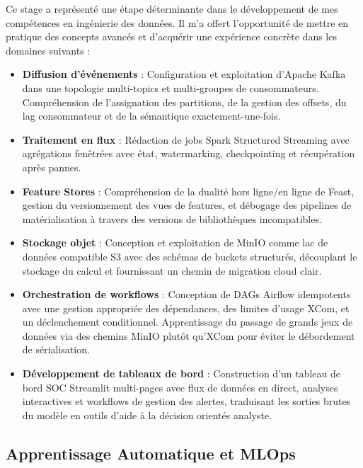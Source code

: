 \documentclass[12pt,a4paper,oneside]{book}
\theoremstyle{definition}
\theoremstyle{plain}
\begin{document}
Ce stage a représenté une étape déterminante dans le développement de mes compétences en ingénierie des données. Il m'a offert l'opportunité de mettre en pratique des concepts avancés et d'acquérir une expérience concrète dans les domaines suivants :
\begin{itemize}
  \item \textbf{Diffusion d'événements} : Configuration et exploitation d'Apache Kafka dans une topologie multi-topics et multi-groupes de consommateurs. Compréhension de l'assignation des partitions, de la gestion des offsets, du lag consommateur et de la sémantique exactement-une-fois.
  \item \textbf{Traitement en flux} : Rédaction de jobs Spark Structured Streaming avec agrégations fenêtrées avec état, watermarking, checkpointing et récupération après pannes.
  \item \textbf{Feature Stores} : Compréhension de la dualité hors ligne/en ligne de Feast, gestion du versionnement des vues de features, et débogage des pipelines de matérialisation à travers des versions de bibliothèques incompatibles.
  \item \textbf{Stockage objet} : Conception et exploitation de MinIO comme lac de données compatible S3 avec des schémas de buckets structurés, découplant le stockage du calcul et fournissant un chemin de migration cloud clair.
  \item \textbf{Orchestration de workflows} : Conception de DAGs Airflow idempotents avec une gestion appropriée des dépendances, des limites d'usage XCom, et un déclenchement conditionnel. Apprentissage du passage de grands jeux de données via des chemins MinIO plutôt qu'XCom pour éviter le débordement de sérialisation.
  \item \textbf{Développement de tableaux de bord} : Construction d'un tableau de bord SOC Streamlit multi-pages avec flux de données en direct, analyses interactives et workflows de gestion des alertes, traduisant les sorties brutes du modèle en outils d'aide à la décision orientés analyste.
\end{itemize}

\subsection{Apprentissage Automatique et MLOps}
\end{document}
